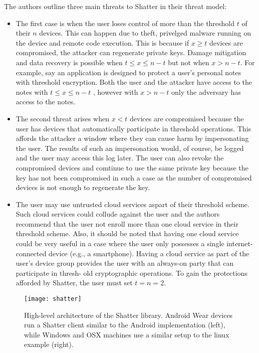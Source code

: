 The authors outline three main threats to Shatter in their threat model:
\begin{itemize}
	
	\item The first case is when the user loses control of more than the threshold $t$ of their $n$ devices. This can happen due to theft, privelged 			malware running on the device and remote code execution. This is because if $x\geq t$ devices are compromised, the attacker can regenerate 			private keys. Damage mitigation and data recovery is possible when $t\leq x\leq n - t$ but not when $x>n - t$. For example, say an application is 	designed to protect a user's personal notes with threshold encryption. Both the user and the attacker have access to the notes with $t\leq x\leq 		n - t$	, however with $x > n-t$ only the adversary has access to the notes.
	\item The second threat arises when $x < t$ devices are compromised because the user has devices that automatically participate in threshold 			operations. This affords the attacker a window where they can cause harm by impersonating the user. The results of such an impersonation 				would, of course, be logged and the user may access this log later. The user can also revoke the compromised devices and comtinue to use the 			same private key because the key has not been compromised in such a case as the number of compromised devices is not enough to regenerate 		the key.
	\item The user may use untrusted cloud services aspart of their threshold scheme. Such cloud services could collude against the user and the 			authors recommend that the user not enroll more than one cloud service in their threshold scheme. Also, it should be noted that having one cloud 	service could be very useful in a case where the user only possesses a single internet-connected device (e.g., a smartphone). Having a cloud 				service as part of the user's device group provides the user with an always-on party that can participate in thresh- old cryptographic operations. 		To gain the protections afforded by Shatter, the user must  set $t = n = 2$.
\end{itemize}


\begin{figure*}[h]
	\centering
	\texttt{[image: shatter]}
	\caption{High-level architecture of the Shatter library\cite{Atwater2016}. 
		Android Wear devices run a Shatter client similar to the Android 					
		implementation (left), while Windows and OSX machines use a similar
		setup to the linux example (right).}
	\label{fig:shatter}
\end{figure*}

